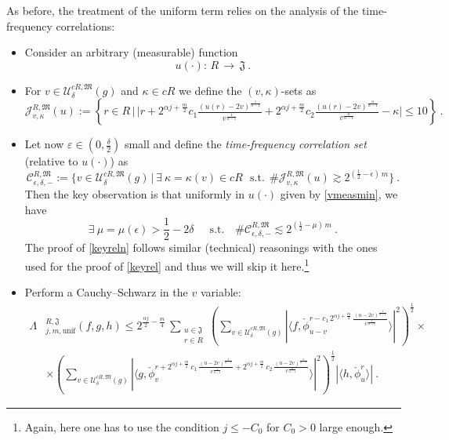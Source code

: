 \documentclass[a4paper,reqno]{amsart}
\numberwithin{equation}{section}
\theoremstyle{definition}
\newcommand{\e}{\varepsilon}
\def\beq{\begin{equation}}
\def\eeq{\end{equation}}
\def\beq{\begin{equation}}
\def\eeq{\end{equation}}
\def\a{\alpha}
\def\J{\mathcal{J}}
\def\beq{\begin{equation}}
\def\eeq{\end{equation}}
\def\beq{\begin{equation}}
\def\eeq{\end{equation}}
\def\d{\delta}
\def\ep{\epsilon}
\def\L{\Lambda}
\begin{document}
As before, the treatment of the uniform term relies on the analysis of the time-frequency correlations:
\begin{itemize}
\item  Consider an arbitrary (measurable) function
\beq\label{vmeasmin}
u(\cdot):\,R\,\longrightarrow\,\mathfrak{J}\:.
\eeq
\item For $v\in \mathcal{U}_{\d}^{c R,\mathfrak{M}}(g)$  and $\kappa\in c R$ we define the $(v,\kappa)$-sets as
\begin{equation}\label{tfreqcorn}
	\J_{v,\kappa}^{R,\mathfrak{M}}(u)\!:=\!\left\{r\in R\,\Big|\,\big|r+2^{\a j+\frac{m}{2}} c_1\tfrac{(u(r)-2v)^{\frac{1}{\a-1}}}{v^{\frac{1}{\a-1}}}+
	2^{\a j+\frac{m}{2}} c_2\tfrac{(u(r)-2v)^{\frac{\a}{\a-1}}}{v^{\frac{\a}{\a-1}}} -\kappa\big|\leq 10\right\}\:.
\end{equation}
\item Let now $\e\in (0,\frac{\d}{2})$ small and define the \emph{time-frequency correlation set} (relative to $u(\cdot)$) as
\beq\label{tfreqcor1n}
\boxed{\mathcal{C}_{\ep,\d,-}^{R,\mathfrak{M}}:=\big\{v\in \mathcal{U}_{\d}^{c R,\mathfrak{M}}(g) \,|\,\exists\:\kappa=\kappa(v)\in c R\:\:\:\textrm{s.t.}\:\: \#\J_{v,\kappa}^{R,\mathfrak{M}}(u)\gtrsim 2^{(\frac{1}{2}-\ep)\,m}\big\}\:.}
\eeq
Then the key observation is that uniformly in $u(\cdot)$ given by \eqref{vmeasmin}, we have
\beq\label{keyreln}
\boxed{\exists\:\mu=\mu(\ep)>\frac{1}{2}-2\d\:\:\quad\textrm{s.t.}\quad\#\mathcal{C}_{\ep,\d,-}^{R,\mathfrak{M}}\lesssim 2^{(\frac{1}{2}-\mu)\,m}\:.}
\eeq
The proof of \eqref{keyreln} follows  similar (technical) reasonings with the ones used for the proof of \eqref{keyrel} and thus we will skip it here.\footnote{Again, here one has to use the condition $j\leq - C_0$ for $C_0>0$ large enough.}

\item Perform a Cauchy--Schwarz in the $v$ variable:
\begin{align}
	\L&_{j,m,\textrm{unif}}^{R,\mathfrak{J}}(f,g,h)\leq 2^{\frac{\a j}{2}-\frac{m}{4}}\,\sum_{\substack{u\in \mathfrak{J}\\[.2ex] r\in R }} \left(\sum_{v\in \mathcal{U}_{\d}^{c R,\mathfrak{M}}(g)}  |\langle f,  \check{\phi}_{u-v}^{r- c_1\,2^{\a j+\frac{m}{2}}\,\frac{(u-2v)^{\frac{1}{\a-1}}}{v^{\frac{1}{\a-1}}}}\rangle|^2\right)^{\frac{1}{2}}\times\nonumber\\
	&\times \left(\sum_{v\in \mathcal{U}_{\d}^{c R,\mathfrak{M}}(g)} |\langle g,  \check{\phi}_{v}^{r+2^{\a j+\frac{m}{2}}\,c_1\,\frac{(u-2v)^{\frac{1}{\a-1}}}{v^{\frac{1}{\a-1}}}+
		2^{\a j+\frac{m}{2}}\,c_2\, \frac{(u-2v)^{\frac{\a}{\a-1}}}{v^{\frac{\a}{\a-1}}}}\rangle|^2\right)^{\frac{1}{2}} |\langle h,  \check{\phi}_{u}^{r}\rangle|\:.\label{ljmunif1n}
\end{align}


\end{itemize}
\end{document}

